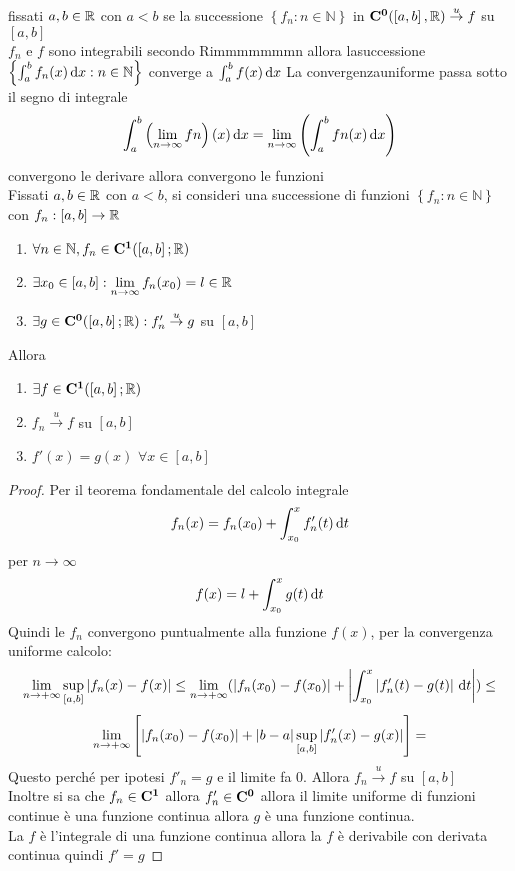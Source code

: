 \proposition
fissati $a,b\in \mathbb{R}$ con $a<b$ se la successione $\left\{f_n:n\in\mathbb{N}\right\}$ in $\mathbf{C^{0}}(\left[a,b\right], \mathbb{R})\overset{u}{\to}f$ su $\left[a,b\right]$\\
$f_n$ e $f$ sono integrabili secondo Rimmmmmmmn allora lasuccessione $\left\{\int_a^bf_n(x)\,\mathrm{d}{x}:n\in\mathbb{N}\right\}$ converge a $\int_a^bf(x)\,\mathrm{d}{x}$
\observation
La convergenzauniforme passa sotto il segno di integrale 
$$\int_a^b\left(\lim\limits_{n\to\infty}fn\right)(x)\,\mathrm{d}{x}=\lim\limits_{n\to\infty}\left(\int_a^bfn(x)\,\mathrm{d}{x}\right)$$
\proposition convergono le derivare allora convergono le funzioni\\
Fissati $a,b\in \mathbb{R}$ con $a<b$, si consideri una successione di funzioni $\left\{f_n:n\in\mathbb{N}\right\}$ con $f_n:\left[a,b\right]\to \mathbb{R}$
\begin{enumerate}
	\item $\forall n\in\mathbb{N}, f_n\in \mathbf{C^{1}}(\left[a,b\right]; \mathbb{R})$
	\item $\exists x_0\in\left[a,b\right]: \lim\limits_{n\to\infty}f_n(x_0)=l\in \mathbb{R}$
	\item $\exists g \in \mathbf{C^{0}}(\left[a,b\right]; \mathbb{R}):f'_n\overset{u}{\to}g$ su $\left[a,b\right]$
\end{enumerate}
Allora
\begin{enumerate}
	\item $\exists f\in \mathbf{C^{1}}(\left[a,b\right]; \mathbb{R})$
	\item $f_n\overset{u}{\to}f$ su $\left[a,b\right]$
	\item $f'(x)=g(x)$ $\forall x\in\left[a,b\right]$
\end{enumerate}
\begin{proof}
	Per il teorema fondamentale del calcolo integrale
	$$f_n(x)=f_n(x_0)+\int_{x_0}^{x}f_n'(t)\,\mathrm{d}{t}$$
	per $n\to\infty$
	$$f(x)=l+\int_{x_0}^{x}g(t)\,\mathrm{d}{t}$$
	Quindi le $f_n$ convergono puntualmente alla funzione $f(x)$, per la convergenza uniforme calcolo:
	$$ \lim\limits_{n\to+\infty}\sup\limits_{\left[a,b\right]}\left|f_n(x)-f(x)\right|\le\lim\limits_{n\to+\infty}(\left|f_n(x_0)-f(x_0)\right|+\left|\int_{x_0}^x \left|f_n'(t)-g(t)\right|\,\mathrm{d}{t}\right|)\le$$
	$$\lim\limits_{n\to+\infty}\left[ \left|f_n(x_0)-f(x_0)\right|+\left|b-a\right|\sup\limits_{\left[a,b\right]}\left|f_n'(x)-g(x)\right| \right] = $$
	Questo perché per ipotesi $f'_n=g$ e il limite fa $0$.
	Allora $f_n\overset{u}{\to}f$ su $\left[a,b\right]$\\
	Inoltre si sa che $f_n\in \mathbf{C^{1}}$ allora $f_n'\in \mathbf{C^{0}}$ allora il limite uniforme di funzioni continue è una funzione continua allora $g$ è una funzione continua.\\
	La $f$ è l'integrale di una funzione continua allora la $f$ è derivabile con derivata continua quindi $f'=g$
\end{proof}
